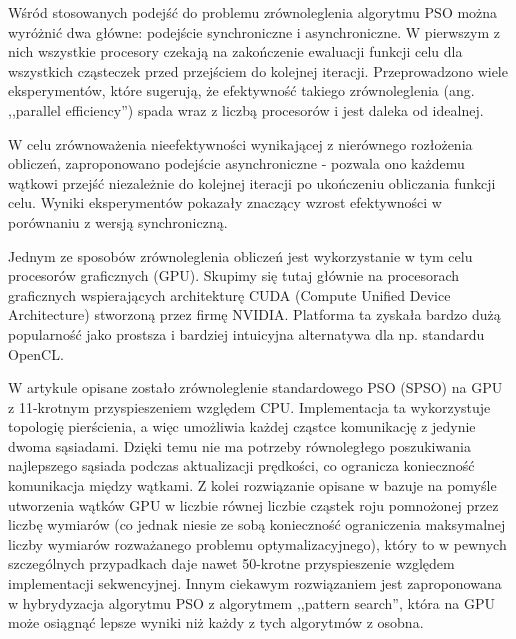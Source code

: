 \documentclass[12pt, twoside, openany, abstract=on]{report}
\theoremstyle{definition}
\begin{document}
Wśród stosowanych podejść do problemu zrównoleglenia algorytmu PSO można wyróżnić dwa główne: podejście synchroniczne i asynchroniczne. W pierwszym z nich wszystkie procesory czekają na zakończenie ewaluacji funkcji celu dla wszystkich cząsteczek przed przejściem do kolejnej iteracji. Przeprowadzono wiele eksperymentów, które sugerują, że efektywność takiego zrównoleglenia (ang. ,,parallel efficiency'') spada wraz z liczbą procesorów i jest daleka od idealnej.

W celu zrównoważenia nieefektywności wynikającej z nierównego rozłożenia obliczeń, zaproponowano podejście asynchroniczne - pozwala ono każdemu wątkowi przejść niezależnie do kolejnej iteracji po ukończeniu obliczania funkcji celu. Wyniki eksperymentów pokazały znaczący wzrost efektywności w porównaniu z wersją synchroniczną. 

Jednym ze sposobów zrównoleglenia obliczeń jest wykorzystanie w tym celu procesorów graficznych (GPU). Skupimy się tutaj głównie na procesorach graficznych wspierających architekturę CUDA (Compute Unified Device Architecture) \cite{CudaProgGuide} stworzoną przez firmę NVIDIA. Platforma ta zyskała bardzo dużą popularność jako prostsza i bardziej intuicyjna alternatywa dla np. standardu OpenCL.

W artykule \cite{GpuBasedPso} opisane zostało zrównoleglenie standardowego PSO (SPSO) na GPU z 11-krotnym przyspieszeniem względem CPU. Implementacja ta wykorzystuje topologię pierścienia, a więc umożliwia każdej cząstce komunikację z jedynie dwoma sąsiadami. Dzięki temu nie ma potrzeby równoległego poszukiwania najlepszego sąsiada podczas aktualizacji prędkości, co ogranicza konieczność komunikacja między wątkami. Z kolei rozwiązanie opisane w \cite{PsoCuda} bazuje na pomyśle utworzenia wątków GPU w liczbie równej liczbie cząstek roju pomnożonej przez liczbę wymiarów (co jednak niesie ze sobą konieczność ograniczenia maksymalnej liczby wymiarów rozważanego problemu optymalizacyjnego), który to w pewnych szczególnych przypadkach daje nawet 50-krotne przyspieszenie względem implementacji sekwencyjnej. Innym ciekawym rozwiązaniem jest zaproponowana w \cite{PsoGraphHardLocPat} hybrydyzacja algorytmu PSO z algorytmem ,,pattern search'', która na GPU może osiągnąć lepsze wyniki niż każdy z tych algorytmów z osobna. 

\end{document}
